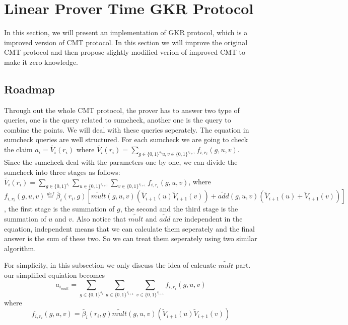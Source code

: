 \section{Linear Prover Time GKR Protocol}
\label{sec::gkrlin}
In this section, we will present an implementation of GKR protocol\cite{GKR}, which is a improved version of CMT protocol\cite{CMT}. In this section we will improve the original CMT protocol and then propose slightly modified verion of improved CMT to make it zero knowledge.

\subsection{Roadmap}
Through out the whole CMT protocol, the prover has to answer two type of queries, one is the query related to sumcheck, another one is the query to combine the points. We will deal with these queries seperately. The equation in sumcheck queries are well structured. For each sumcheck we are going to check the claim $a_i=\tilde{V_i}(r_i)$ where $\tilde{V_i}(r_i)=\sum_{g\in\{0,1\}^{s_i} u, v\in \{0,1\}^{s_{i+1}}}f_{i,r_i}(g,u,v)$. Since the sumcheck deal with the parameters one by one, we can divide the sumcheck into three stages as follows: $\tilde{V_i}(r_i)=\sum_{g\in\{0,1\}^{s_i}}\sum_{u \in \{0,1\}^{s_{i+1}}} \sum_{v\in \{0,1\}^{s_{i+1}}}f_{i,r_i}(g,u,v)$, where $f_{i,r_i}(g,u,v)\overset{def}{=}\tilde{\beta_{i}}(r_i, g)[\tilde{mult}(g, u, v)(\tilde{V}_{i+1}(u)\tilde{V}_{i+1}(v))+\tilde{add}(g,u,v)(\tilde{V}_{i+1}(u)+\tilde{V}_{i+1}(v))]$, the first stage is the summation of $g$, the second and the third stage is the summation of $u$ and $v$. Also notice that $\tilde{mult}$ and $\tilde{add}$ are independent in the equation, independent means that we can calculate them seperately and the final answer is the sum of these two. So we can treat them seperately using two similar algorithm.

For simplicity, in this subsection we only discuss the idea of calcuate $\tilde{mult}$ part. our simplified equiation becomes 
$$a_{i_{mult}}=\sum_{g\in\{0,1\}^{s_i}}\sum_{u \in \{0,1\}^{s_{i+1}}} \sum_{v\in \{0,1\}^{s_{i+1}}}f_{i, r_i}(g, u, v)$$ where $$f_{i, r_i}(g, u, v)=\tilde{\beta_{i}}(r_i, g)\tilde{mult}(g, u, v)(\tilde{V}_{i+1}(u)\tilde{V}_{i+1}(v))$$


